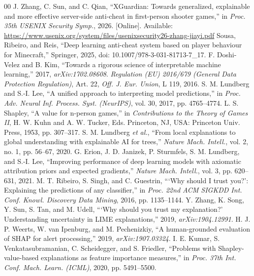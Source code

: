 \documentclass[conference]{IEEEtran}
\begin{document}
\begin{thebibliography}{00}
 J. Zhang, C. Sun, and C. Qian, ``XGuardian: Towards generalized, explainable and more effective server-side anti-cheat in first-person shooter games,'' in \textit{Proc. 35th USENIX Security Symp.}, 2026. [Online]. Available: \url{https://www.usenix.org/system/files/usenixsecurity26-zhang-jiayi.pdf}
 Sousa, Ribeiro, and Reis, ``Deep learning anti-cheat system based on player behaviour for Minecraft,'' Springer, 2025, doi: 10.1007/978-3-031-81713-7\_17.
 F. Doshi-Velez and B. Kim, ``Towards a rigorous science of interpretable machine learning,'' 2017, \textit{arXiv:1702.08608}.
 \textit{Regulation (EU) 2016/679 (General Data Protection Regulation)}, Art. 22, \textit{Off. J. Eur. Union}, L 119, 2016.
 S. M. Lundberg and S.-I. Lee, ``A unified approach to interpreting model predictions,'' in \textit{Proc. Adv. Neural Inf. Process. Syst. (NeurIPS)}, vol. 30, 2017, pp. 4765--4774.
 L. S. Shapley, ``A value for n-person games,'' in \textit{Contributions to the Theory of Games II}, H. W. Kuhn and A. W. Tucker, Eds. Princeton, NJ, USA: Princeton Univ. Press, 1953, pp. 307--317.
 S. M. Lundberg \textit{et al.}, ``From local explanations to global understanding with explainable AI for trees,'' \textit{Nature Mach. Intell.}, vol. 2, no. 1, pp. 56--67, 2020.
 G. Erion, J. D. Janizek, P. Sturmfels, S. M. Lundberg, and S.-I. Lee, ``Improving performance of deep learning models with axiomatic attribution priors and expected gradients,'' \textit{Nature Mach. Intell.}, vol. 3, pp. 620--631, 2021.
 M. T. Ribeiro, S. Singh, and C. Guestrin, ```Why should I trust you?': Explaining the predictions of any classifier,'' in \textit{Proc. 22nd ACM SIGKDD Int. Conf. Knowl. Discovery Data Mining}, 2016, pp. 1135--1144.
 Y. Zhang, K. Song, Y. Sun, S. Tan, and M. Udell, ```Why should you trust my explanation?' Understanding uncertainty in LIME explanations,'' 2019, \textit{arXiv:1904.12991}.
 H. J. P. Weerts, W. van Ipenburg, and M. Pechenizkiy, ``A human-grounded evaluation of SHAP for alert processing,'' 2019, \textit{arXiv:1907.03324}.
 I. E. Kumar, S. Venkatasubramanian, C. Scheidegger, and S. Friedler, ``Problems with Shapley-value-based explanations as feature importance measures,'' in \textit{Proc. 37th Int. Conf. Mach. Learn. (ICML)}, 2020, pp. 5491--5500.

\end{thebibliography}
\end{document}
